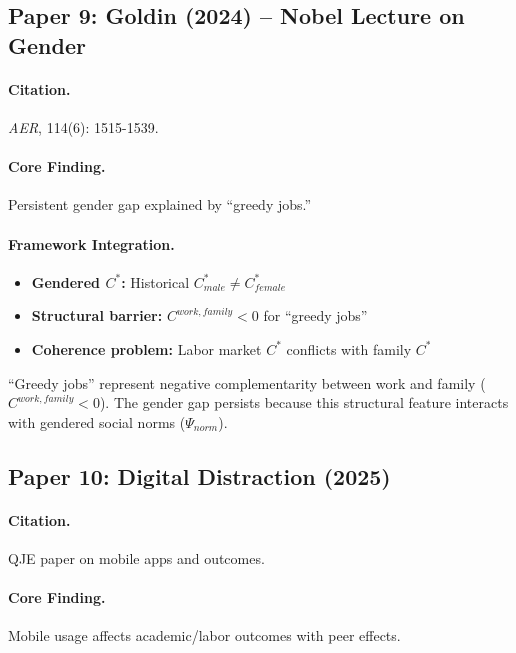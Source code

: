 \subsection{Paper 9: Goldin (2024) -- Nobel Lecture on Gender}

\paragraph{Citation.}
\emph{AER}, 114(6): 1515-1539.

\paragraph{Core Finding.}
Persistent gender gap explained by ``greedy jobs.''

\paragraph{Framework Integration.}
\begin{itemize}
  \item \textbf{Gendered $C^*$:} Historical $C^*_{male} \neq C^*_{female}$
  \item \textbf{Structural barrier:} $C^{work,family} < 0$ for ``greedy jobs''
  \item \textbf{Coherence problem:} Labor market $C^*$ conflicts with family $C^*$
\end{itemize}

\begin{tcolorbox}[colback=yellow!5!white, colframe=yellow!75!black,
    title=EBF Insight: Gender Economics]
``Greedy jobs'' represent negative complementarity between work and family
($C^{work,family} < 0$). The gender gap persists because this structural
feature interacts with gendered social norms ($\Psi_{norm}$).
\end{tcolorbox}


\subsection{Paper 10: Digital Distraction (2025)}

\paragraph{Citation.}
QJE paper on mobile apps and outcomes.

\paragraph{Core Finding.}
Mobile usage affects academic/labor outcomes with peer effects.

